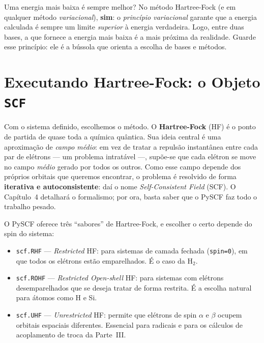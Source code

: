 \documentclass[11pt,a4paper,openany]{book}
\newcommand{\code}[1]{\texttt{#1}}
\newcommand{\pyscf}{\textsf{PySCF}}
\begin{document}
\begin{caixadica}
Uma energia mais baixa é sempre melhor? No método Hartree-Fock (e em qualquer
método \emph{variacional}), \textbf{sim}: o \emph{princípio variacional} garante
que a energia calculada é sempre um limite \emph{superior} à energia verdadeira.
Logo, entre duas bases, a que fornece a energia mais baixa é a mais próxima da
realidade. Guarde esse princípio: ele é a bússola que orienta a escolha de bases
e métodos.
\end{caixadica}

\section{Executando Hartree-Fock: o Objeto \code{SCF}}
\label{sec:scf}

Com o sistema definido, escolhemos o método. O \textbf{Hartree-Fock} (HF) é o
ponto de partida de quase toda a química quântica. Sua ideia central é uma
aproximação de \emph{campo médio}: em vez de tratar a repulsão instantânea entre
cada par de elétrons --- um problema intratável ---, supõe-se que cada elétron se
move no campo \emph{médio} gerado por todos os outros. Como esse campo depende dos
próprios orbitais que queremos encontrar, o problema é resolvido de forma
\textbf{iterativa e autoconsistente}: daí o nome \emph{Self-Consistent Field}
(SCF). O Capítulo~4 detalhará o formalismo; por ora, basta saber que o \pyscf{}
faz todo o trabalho pesado.

O \pyscf{} oferece três ``sabores'' de Hartree-Fock, e escolher o certo depende
do spin do sistema:

\begin{itemize}[leftmargin=*]
  \item \code{scf.RHF} --- \emph{Restricted} HF: para sistemas de camada fechada
        (\code{spin=0}), em que todos os elétrons estão emparelhados. É o caso da
        H$_2$.
  \item \code{scf.ROHF} --- \emph{Restricted Open-shell} HF: para sistemas com
        elétrons desemparelhados que se deseja tratar de forma restrita. É a
        escolha natural para átomos como H e Si.
  \item \code{scf.UHF} --- \emph{Unrestricted} HF: permite que elétrons de spin
        $\alpha$ e $\beta$ ocupem orbitais espaciais diferentes. Essencial para
        radicais e para os cálculos de acoplamento de troca da Parte~III.
\end{itemize}
\end{document}
